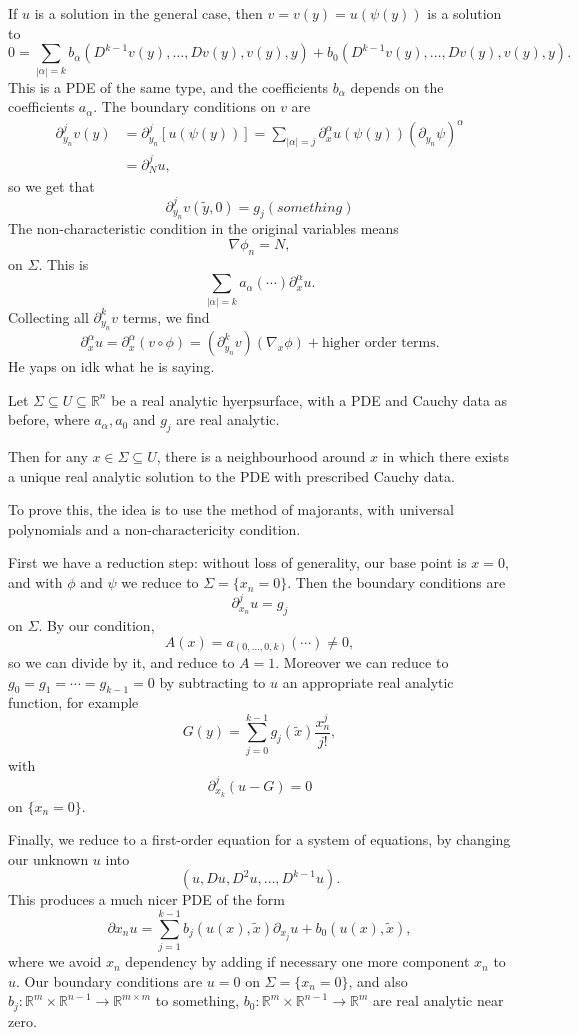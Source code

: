 \documentclass[12pt]{article}
\begin{document}
If $u$ is a solution in the general case, then $v = v(y) = u(\psi(y))$ is a solution to
\[
0 = \sum_{|\alpha| = k} b_\alpha (D^{k-1} v(y), \ldots, D v(y), v(y), y) + b_0 (D^{k-1} v(y), \ldots, D v(y), v(y), y).
\]
This is a PDE of the same type, and the coefficients $b_\alpha$ depends on the coefficients $a_\alpha$. The boundary conditions on $v$ are
\begin{align*}
	\partial^j_{y_n} v(y) &= \partial^j_{y_n} [u(\psi(y))] = \sum_{|\alpha| = j} \partial^\alpha_{x} u(\psi(y))(\partial_{y_n} \psi)^\alpha \\
			      &= \partial^j_N u,
\end{align*}
so we get that
\[
\partial^j_{y_n} v(\tilde y, 0) = g_j(something)
\]
The non-characteristic condition in the original variables means
\[
\nabla \phi_n = N,
\]
on $\Sigma$. This is
\[
\sum_{|\alpha| = k} a_\alpha(\cdots) \partial^\alpha_{x} u.
\]
Collecting all $\partial^k_{y_n} v$ terms, we find
\[
	\partial^\alpha_x u = \partial^\alpha_x(v \circ \phi) = (\partial^k_{y_n} v) (\nabla_x \phi) + \text{higher order terms}.
\]
He yaps on idk what he is saying.

\begin{theorem}
	Let $\Sigma \subseteq U \subseteq \mathbb{R}^n$ be a real analytic hyerpsurface, with a PDE and Cauchy data as before, where $a_\alpha, a_0$ and $g_j$ are real analytic.

	Then for any $x \in \Sigma \subseteq U$, there is a neighbourhood around $x$ in which there exists a unique real analytic solution to the PDE with prescribed Cauchy data.
\end{theorem}

To prove this, the idea is to use the method of majorants, with universal polynomials and a non-charactericity condition.

First we have a reduction step: without loss of generality, our base point is $x = 0$, and with $\phi$ and $\psi$ we reduce to $\Sigma = \{x_n = 0\}$. Then the boundary conditions are
\[
\partial^j_{x_n} u = g_j
\]
on $\Sigma$. By our condition,
\[
A(x) = a_{(0, \ldots, 0, k)} (\cdots) \neq 0,
\]
so we can divide by it, and reduce to $A = 1$. Moreover we can reduce to $g_0 = g_1 = \cdots = g_{k-1} = 0$ by subtracting to $u$ an appropriate real analytic function, for example
\[
G(y) = \sum_{j = 0}^{k-1} g_j(\tilde x) \frac{x_n^j}{j!},
\]
with
\[
\partial^j_{x_k}(u - G) = 0
\]
on $\{x_n = 0\}$.

Finally, we reduce to a first-order equation for a system of equations, by changing our unknown $u$ into
\[
	(u, Du, D^2 u, \ldots, D^{k-1} u).
\]
This produces a much nicer PDE of the form
\[
\partial x_n u = \sum_{j = 1}^{k-1} b_j (u(x), \tilde x) \partial_{x_j} u + b_0 (u(x), \tilde x),
\]
where we avoid $x_n$ dependency by adding if necessary one more component $x_n$ to $u$. Our boundary conditions are $u = 0$ on $\Sigma = \{x_n = 0\}$, and also $b_j : \mathbb{R}^m \times \mathbb{R}^{n-1} \to \mathbb{R}^{m \times m}$ to something, $b_0 : \mathbb{R}^{m} \times \mathbb{R}^{n-1} \to \mathbb{R}^m$ are real analytic near zero.
\end{document}
